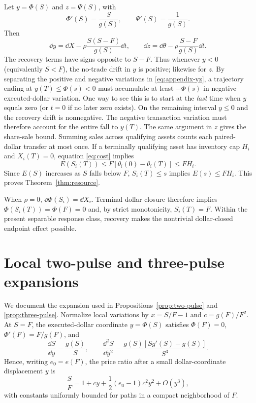 \documentclass[review,hidelinks,onefignum,onetabnum]{siamonline250211}
\begin{document}
Let $y=\Phi(S)$ and $z=\Psi(S)$, with
\[
\Phi'(S)=\frac{S}{g(S)},\qquad \Psi'(S)=\frac1{g(S)}.
\]
Then
\begin{equation}\label{eq:appendix-yz}
\dd y=\dd X-\rho\frac{S(S-F)}{g(S)}\dd t,
\qquad
\dd z=\dd\theta-\rho\frac{S-F}{g(S)}\dd t.
\end{equation}
The recovery terms have signs opposite to $S-F$. Thus whenever $y<0$ (equivalently $S<F$), the no-trade drift in $y$ is positive; likewise for $z$. By separating the positive and negative variations in \eqref{eq:appendix-yz}, a trajectory ending at $y(T)\le\Phi(s)<0$ must accumulate at least $-\Phi(s)$ in negative executed-dollar variation. One way to see this is to start at the \emph{last} time when $y$ equals zero (or $t=0$ if no later zero exists). On the remaining interval $y\le0$ and the recovery drift is nonnegative. The negative transaction variation must therefore account for the entire fall to $y(T)$. The same argument in $z$ gives the share-sale bound. Summing sales across qualifying assets counts each paired-dollar transfer at most once. If a terminally qualifying asset has inventory cap $H_i$ and $X_i(T)=0$, equation \eqref{eq:cost} implies
\[
E(S_i(T))\le F\left[\theta_i(0)-\theta_i(T)\right]\le FH_i.
\]
Since $E(S)$ increases as $S$ falls below $F$, $S_i(T)\le s$ implies $E(s)\le FH_i$. This proves Theorem~\ref{thm:resource}.

When $\rho=0$, $\dd\Phi(S_i)=\dd X_i$. Terminal dollar closure therefore implies $\Phi(S_i(T))=\Phi(F)=0$ and, by strict monotonicity, $S_i(T)=F$. Within the present separable response class, recovery makes the nontrivial dollar-closed endpoint effect possible.

\section{Local two-pulse and three-pulse expansions}\label{app:local}
We document the expansion used in Propositions~\ref{prop:two-pulse} and \ref{prop:three-pulse}. Normalize local variations by $x=S/F-1$ and $c=g(F)/F^2$. At $S=F$, the executed-dollar coordinate $y=\Phi(S)$ satisfies $\Phi(F)=0$, $\Phi'(F)=F/g(F)$, and
\begin{equation}\label{eq:local-inverse}
\frac{\dd S}{\dd y}=\frac{g(S)}S,
\qquad
\frac{\dd^2 S}{\dd y^2}=
\frac{g(S)[Sg'(S)-g(S)]}{S^3}.
\end{equation}
Hence, writing $e_0=e(F)$, the price ratio after a small dollar-coordinate displacement $y$ is
\begin{equation}\label{eq:local-Taylor}
\frac SF=1+cy+\frac12(e_0-1)c^2y^2+O(y^3),
\end{equation}
with constants uniformly bounded for paths in a compact neighborhood of $F$.
\end{document}
